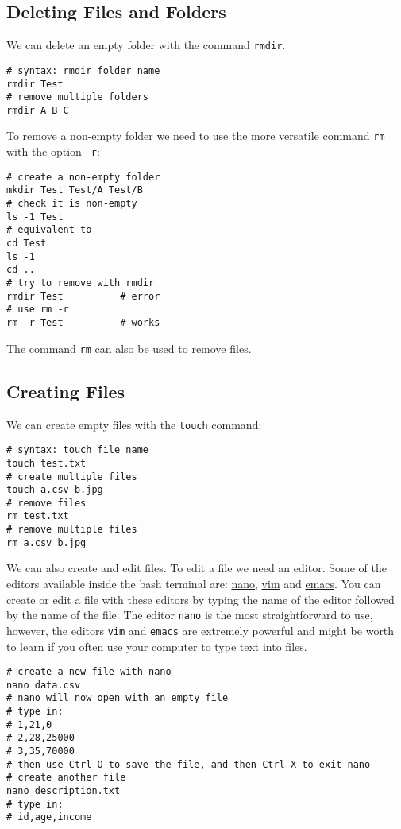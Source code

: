 \documentclass[12pt, a4paper]{article}
\begin{document}
\subsection{Deleting Files and Folders}
\label{sec:org0c7a8b5}
We can delete an empty folder with the command \texttt{rmdir}.
\lstset{language=bash,label= ,caption= ,captionpos=b,firstnumber=1,numbers=left,style=bash}
\begin{lstlisting}
# syntax: rmdir folder_name
rmdir Test
# remove multiple folders
rmdir A B C
\end{lstlisting}
To remove a non-empty folder we need to use the more versatile command \texttt{rm} with the option \texttt{-r}:
\lstset{language=bash,label= ,caption= ,captionpos=b,firstnumber=1,numbers=left,style=bash}
\begin{lstlisting}
# create a non-empty folder
mkdir Test Test/A Test/B
# check it is non-empty
ls -1 Test
# equivalent to
cd Test
ls -1
cd ..
# try to remove with rmdir
rmdir Test			# error
# use rm -r
rm -r Test			# works
\end{lstlisting}
The command \texttt{rm} can also be used to remove files.
\subsection{Creating Files}
\label{sec:org6fc6038}
We can create empty files with the \texttt{touch} command:
\lstset{language=bash,label= ,caption= ,captionpos=b,firstnumber=1,numbers=left,style=bash}
\begin{lstlisting}
# syntax: touch file_name
touch test.txt
# create multiple files
touch a.csv b.jpg
# remove files
rm test.txt
# remove multiple files
rm a.csv b.jpg
\end{lstlisting}
We can also create and edit files.
To edit a file we need an editor.
Some of the editors available inside the bash terminal are: \href{https://www.nano-editor.org}{nano}, \href{https://www.vim.org}{vim} and \href{https://www.gnu.org/software/emacs/}{emacs}.
You can create or edit a file with these editors by typing the name of the editor followed by the name of the file.
The editor \texttt{nano} is the most straightforward to use, however, the editors \texttt{vim} and \texttt{emacs} are extremely powerful and might be worth to learn if you often use your computer to type text into files.
\lstset{language=bash,label= ,caption= ,captionpos=b,firstnumber=1,numbers=left,style=bash}
\begin{lstlisting}
# create a new file with nano
nano data.csv
# nano will now open with an empty file
# type in:
# 1,21,0
# 2,28,25000
# 3,35,70000
# then use Ctrl-O to save the file, and then Ctrl-X to exit nano
# create another file
nano description.txt
# type in:
# id,age,income
\end{lstlisting}
\end{document}
